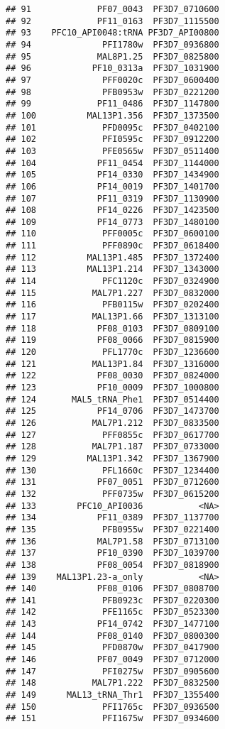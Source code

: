 \documentclass[12pt, a4paper]{article}\usepackage[]{graphicx}\usepackage[]{color}
\makeatletter
\newenvironment{kframe}{%
 \def\at@end@of@kframe{}%
 \ifinner\ifhmode%
  \def\at@end@of@kframe{\end{minipage}}%
  \begin{minipage}{\columnwidth}%
 \fi\fi%
 \def\FrameCommand##1{\hskip\@totalleftmargin \hskip-\fboxsep
 \colorbox{shadecolor}{##1}\hskip-\fboxsep
     \hskip-\linewidth \hskip-\@totalleftmargin \hskip\columnwidth}%
 \MakeFramed {\advance\hsize-\width
   \@totalleftmargin\z@ \linewidth\hsize
   \@setminipage}}%
 {\par\unskip\endMakeFramed%
 \at@end@of@kframe}
\newenvironment{knitrout}{}{} %
\makeatother
\begin{document}
\begin{knitrout}
\begin{kframe}
\begin{verbatim}
## 91             PF07_0043  PF3D7_0710600
## 92             PF11_0163  PF3D7_1115500
## 93    PFC10_API0048:tRNA PF3D7_API00800
## 94              PFI1780w  PF3D7_0936800
## 95             MAL8P1.25  PF3D7_0825800
## 96            PF10_0313a  PF3D7_1031900
## 97              PFF0020c  PF3D7_0600400
## 98              PFB0953w  PF3D7_0221200
## 99             PF11_0486  PF3D7_1147800
## 100          MAL13P1.356  PF3D7_1373500
## 101             PFD0095c  PF3D7_0402100
## 102             PFI0595c  PF3D7_0912200
## 103             PFE0565w  PF3D7_0511400
## 104            PF11_0454  PF3D7_1144000
## 105            PF14_0330  PF3D7_1434900
## 106            PF14_0019  PF3D7_1401700
## 107            PF11_0319  PF3D7_1130900
## 108            PF14_0226  PF3D7_1423500
## 109            PF14_0773  PF3D7_1480100
## 110             PFF0005c  PF3D7_0600100
## 111             PFF0890c  PF3D7_0618400
## 112          MAL13P1.485  PF3D7_1372400
## 113          MAL13P1.214  PF3D7_1343000
## 114             PFC1120c  PF3D7_0324900
## 115           MAL7P1.227  PF3D7_0832000
## 116             PFB0115w  PF3D7_0202400
## 117           MAL13P1.66  PF3D7_1313100
## 118            PF08_0103  PF3D7_0809100
## 119            PF08_0066  PF3D7_0815900
## 120             PFL1770c  PF3D7_1236600
## 121           MAL13P1.84  PF3D7_1316000
## 122            PF08_0030  PF3D7_0824000
## 123            PF10_0009  PF3D7_1000800
## 124       MAL5_tRNA_Phe1  PF3D7_0514400
## 125            PF14_0706  PF3D7_1473700
## 126           MAL7P1.212  PF3D7_0833500
## 127             PFF0855c  PF3D7_0617700
## 128           MAL7P1.187  PF3D7_0733000
## 129          MAL13P1.342  PF3D7_1367900
## 130             PFL1660c  PF3D7_1234400
## 131            PF07_0051  PF3D7_0712600
## 132             PFF0735w  PF3D7_0615200
## 133        PFC10_API0036           <NA>
## 134            PF11_0389  PF3D7_1137700
## 135             PFB0955w  PF3D7_0221400
## 136            MAL7P1.58  PF3D7_0713100
## 137            PF10_0390  PF3D7_1039700
## 138            PF08_0054  PF3D7_0818900
## 139    MAL13P1.23-a_only           <NA>
## 140            PF08_0106  PF3D7_0808700
## 141             PFB0923c  PF3D7_0220300
## 142             PFE1165c  PF3D7_0523300
## 143            PF14_0742  PF3D7_1477100
## 144            PF08_0140  PF3D7_0800300
## 145             PFD0870w  PF3D7_0417900
## 146            PF07_0049  PF3D7_0712000
## 147             PFI0275w  PF3D7_0905600
## 148           MAL7P1.222  PF3D7_0832500
## 149      MAL13_tRNA_Thr1  PF3D7_1355400
## 150             PFI1765c  PF3D7_0936500
## 151             PFI1675w  PF3D7_0934600

\end{verbatim}
\end{kframe}
\end{knitrout}
\end{document}
